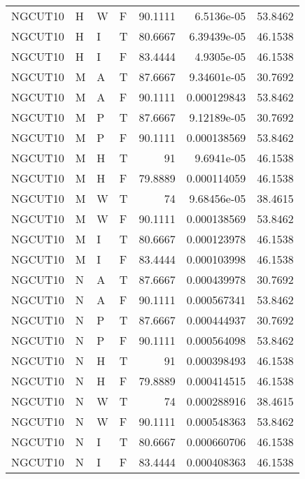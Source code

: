 \begin{table}[!htb]
{\begin{tabular}{llllrrr}
            NGCUT10  & H     & W     & F          & 90.1111    & 6.5136e-05  & 53.8462  \\
            NGCUT10  & H     & I     & T          & 80.6667    & 6.39439e-05 & 46.1538  \\
            NGCUT10  & H     & I     & F          & 83.4444    & 4.9305e-05  & 46.1538  \\
            NGCUT10  & M     & A     & T          & 87.6667    & 9.34601e-05 & 30.7692  \\
            NGCUT10  & M     & A     & F          & 90.1111    & 0.000129843 & 53.8462  \\
            NGCUT10  & M     & P     & T          & 87.6667    & 9.12189e-05 & 30.7692  \\
            NGCUT10  & M     & P     & F          & 90.1111    & 0.000138569 & 53.8462  \\
            NGCUT10  & M     & H     & T          & 91         & 9.6941e-05  & 46.1538  \\
            NGCUT10  & M     & H     & F          & 79.8889    & 0.000114059 & 46.1538  \\
            NGCUT10  & M     & W     & T          & 74         & 9.68456e-05 & 38.4615  \\
            NGCUT10  & M     & W     & F          & 90.1111    & 0.000138569 & 53.8462  \\
            NGCUT10  & M     & I     & T          & 80.6667    & 0.000123978 & 46.1538  \\
            NGCUT10  & M     & I     & F          & 83.4444    & 0.000103998 & 46.1538  \\
            NGCUT10  & N     & A     & T          & 87.6667    & 0.000439978 & 30.7692  \\
            NGCUT10  & N     & A     & F          & 90.1111    & 0.000567341 & 53.8462  \\
            NGCUT10  & N     & P     & T          & 87.6667    & 0.000444937 & 30.7692  \\
            NGCUT10  & N     & P     & F          & 90.1111    & 0.000564098 & 53.8462  \\
            NGCUT10  & N     & H     & T          & 91         & 0.000398493 & 46.1538  \\
            NGCUT10  & N     & H     & F          & 79.8889    & 0.000414515 & 46.1538  \\
            NGCUT10  & N     & W     & T          & 74         & 0.000288916 & 38.4615  \\
            NGCUT10  & N     & W     & F          & 90.1111    & 0.000548363 & 53.8462  \\
            NGCUT10  & N     & I     & T          & 80.6667    & 0.000660706 & 46.1538  \\
            NGCUT10  & N     & I     & F          & 83.4444    & 0.000408363 & 46.1538  \\
            \hline
        \end{tabular}
    }{}
\end{table}